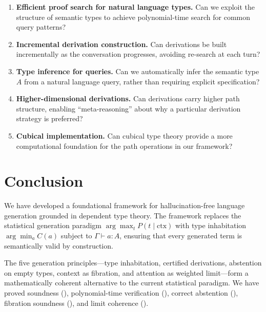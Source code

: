 \documentclass[11pt,a4paper]{article}
\theoremstyle{plain}
\theoremstyle{definition}
\theoremstyle{remark}
\begin{document}
\begin{enumerate}[nosep]
  \item \textbf{Efficient proof search for natural language types.} Can we exploit the structure of semantic types to achieve polynomial-time search for common query patterns?

  \item \textbf{Incremental derivation construction.} Can derivations be built incrementally as the conversation progresses, avoiding re-search at each turn?

  \item \textbf{Type inference for queries.} Can we automatically infer the semantic type $A$ from a natural language query, rather than requiring explicit specification?

  \item \textbf{Higher-dimensional derivations.} Can derivations carry higher path structure, enabling ``meta-reasoning'' about why a particular derivation strategy is preferred?

  \item \textbf{Cubical implementation.} Can cubical type theory \cite{cohen2018cubical} provide a more computational foundation for the path operations in our framework?
\end{enumerate}


\section{Conclusion}\label{sec:conclusion}

We have developed a foundational framework for hallucination-free language generation grounded in dependent type theory.
The framework replaces the statistical generation paradigm $\arg\max_t P(t \mid \mathrm{ctx})$ with type inhabitation $\arg\min_a C(a)$ subject to $\Gamma \vdash a : A$, ensuring that every generated term is semantically valid by construction.

The five generation principles---type inhabitation, certified derivations, abstention on empty types, context as fibration, and attention as weighted limit---form a mathematically coherent alternative to the current statistical paradigm.
We have proved soundness (), polynomial-time verification (), correct abstention (), fibration soundness (), and limit coherence ().
\end{document}
